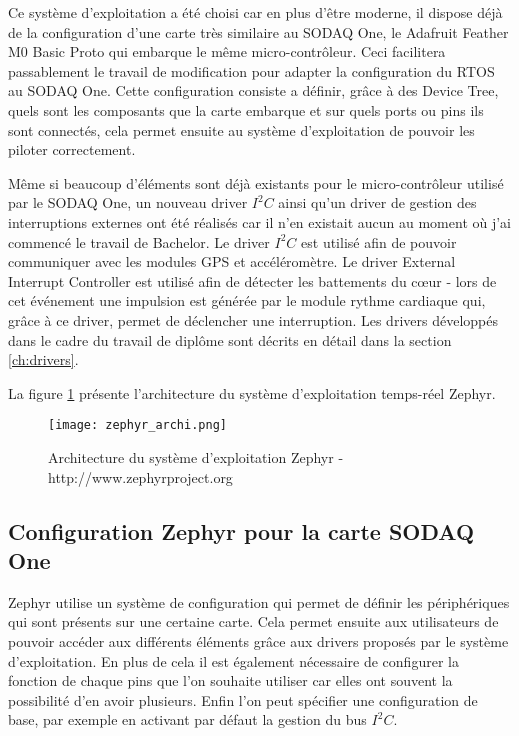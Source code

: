 Ce système d'exploitation a été choisi car en plus d'être moderne, il dispose déjà de la configuration d'une carte très similaire au SODAQ One, le Adafruit Feather M0 Basic Proto qui embarque le même micro-contrôleur. Ceci facilitera passablement le travail de modification pour adapter la configuration du RTOS au SODAQ One. Cette configuration consiste a définir, grâce à des Device Tree, quels sont les composants que la carte embarque et sur quels ports ou pins ils sont connectés, cela permet ensuite au système d'exploitation de pouvoir les piloter correctement.

Même si beaucoup d'éléments sont déjà existants pour le micro-contrôleur utilisé par le SODAQ One, un nouveau driver $I^{2}C$ ainsi qu'un driver de gestion des interruptions externes ont été réalisés car il n'en existait aucun au moment où j'ai commencé le travail de Bachelor. Le driver $I^{2}C$ est utilisé afin de pouvoir communiquer avec les modules GPS et accéléromètre. Le driver External Interrupt Controller est utilisé afin de détecter les battements du cœur - lors de cet événement une impulsion est générée par le module rythme cardiaque qui, grâce à ce driver, permet de déclencher une interruption. Les drivers développés dans le cadre du travail de diplôme sont décrits en détail dans la section \ref{ch:drivers}.

La figure \ref{fig:zephyr_archi} présente l'architecture du système d'exploitation temps-réel Zephyr.

\begin{figure}[htb]
\centering 
\texttt{[image: zephyr\_archi.png]} 
\caption{Architecture du système d'exploitation Zephyr - http://www.zephyrproject.org}
\label{fig:zephyr_archi}
\end{figure}

\subsection{Configuration Zephyr pour la carte SODAQ One}

Zephyr utilise un système de configuration qui permet de définir les périphériques qui sont présents sur une certaine carte. Cela permet ensuite aux utilisateurs de pouvoir accéder aux différents éléments grâce aux drivers proposés par le système d'exploitation. En plus de cela il est également nécessaire de configurer la fonction de chaque pins que l'on souhaite utiliser car elles ont souvent la possibilité d'en avoir plusieurs. Enfin l'on peut spécifier une configuration de base, par exemple en activant par défaut la gestion du bus $I^{2}C$.

